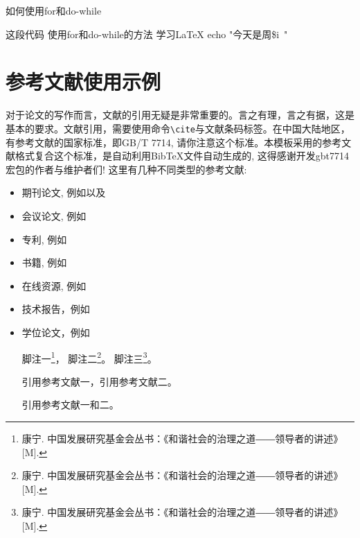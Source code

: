 \begin{breakablealgorithm}
	\caption{如何使用for和do-while} \label{alg-2}
	\begin{algorithmic}[1]  %
		\Require 这段代码
		\Ensure 使用for和do-while的方法
		\Repeat
		\State 学习\LaTeX
		\State echo "今天是周\$i\ "
		\EndFor
		\EndFunction
	\end{algorithmic}
\end{breakablealgorithm}


\section{参考文献使用示例}

对于论文的写作而言，文献的引用无疑是非常重要的。言之有理，言之有据，这是基本的要求。文献引用，需要使用命令\verb|\cite|与文献条码标签。在中国大陆地区，有参考文献的国家标准，即GB/T 7714, 请你注意这个标准。本模板采用的参考文献格式复合这个标准，是自动利用BibTeX文件自动生成的, 这得感谢开发gbt7714宏包的作者与维护者们! 这里有几种不同类型的参考文献:

\begin{itemize}
\item[\ding{172}] 期刊论文, 例如\cite{XmDeng2007,Brown1984,ZHY2017RS,ZHY2012manifold}以及\cite{Wing2006CT}
\item[\ding{173}] 会议论文, 例如\cite{Geyer1999,Branislav2004}
\item[\ding{174}] 专利, 例如\cite{LongMA2015P}
\item[\ding{175}] 书籍, 例如\cite{CDIO2014,ZHY2022}
\item[\ding{176}] 在线资源, 例如\cite{SFMedu,OpenMVS,HainnuThesis}
\item[\ding{177}] 技术报告，例如\cite{Sussman2005}
\item[\ding{178}] 学位论文，例如\cite{ZHY2002,Xue2006,lzj-zhy-MS-thesis-2018,zls-zhy-MS-thesis-2016,zhy-2011-disertation}


脚注一\footnote{康宁. 中国发展研究基金会丛书：《和谐社会的治理之道――领导者的讲述》[M].}，
脚注二\footnote{康宁. 中国发展研究基金会丛书：《和谐社会的治理之道――领导者的讲述》[M].}。
脚注三\footnote{康宁. 中国发展研究基金会丛书：《和谐社会的治理之道――领导者的讲述》[M].}。

引用参考文献一\cite{gao1987}，引用参考文献二\cite{zhang1989}。

引用参考文献一和二\cite{gao1987,zhang1989}。


\end{itemize}
